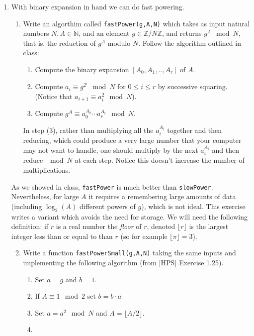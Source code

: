 \documentclass[11pt]{article}
\newcommand{\bN}{\mathbb{N}}
\newcommand{\bZ}{\mathbb{Z}}
\begin{document}
\begin{enumerate}
{  }
  \item{
  With binary expansion in hand we can do fast powering.
  \begin{enumerate}
    \item{
    Write an algorthim called \verb|fastPower(g,A,N)| which takes as input natural numbers $N,A\in\bN$, and an element $g\in\bZ/N\bZ$, and returns $g^A\mod N$, that is, the reduction of $g^A$ modulo $N$.  Follow the algorithm outlined in class:
    \begin{enumerate}[(1)]
      \item{
      Compute the binary expansion $[A_0,A_1,..,A_r]$ of $A$.
      }
      \item{
      Compute $a_i \equiv g^{2^i}\mod N$ for $0\le i\le r$ by successive squaring.  (Notice that $a_{i+1}\equiv a_i^2\mod N$).
      }
      \item{
      Compute $g^A \equiv a_0^{A_0}\cdots a_r^{A_r}\mod N$.
      }
    \end{enumerate}
    In step (3), rather than multiplying all the $a_i^{A_i}$ together and then reducing, which could produce a very large number that your computer may not want to handle, one should multiply by the next $a_i^{A_i}$ and then reduce $\mod N$ at each step.  Notice this doesn't increase the number of multiplications.
    }
  \end{enumerate}
  As we showed in class, \verb|fastPower| is much better than \verb|slowPower|.  Nevertheless, for large $A$ it requires a remembering large amounts of data (including $\log_2(A)$ different powers of $g$), which is not ideal.  This exercise writes a variant which avoids the need for storage.  We will need the following definition: if $r$ is a real number the \textit{floor} of $r$, denoted $\lfloor r\rfloor$ is the largest integer less than or equal to than $r$ (so for example $\lfloor \pi\rfloor = 3$).
  \begin{enumerate}
    \setcounter{enumii}{1}
    \item{
    Write a function \verb|fastPowerSmall(g,A,N)| taking the same inputs and implementing the following algorithm (from [HPS] Exercise 1.25).
    \begin{enumerate}[(1)]
      \item{
      Set $a = g$ and $b = 1$.
      }
      \item{
      If $A\equiv1\mod 2$ set $b = b\cdot a$
      }
      \item{
      Set $a = a^2\mod N$ and $A = \lfloor{A}/{2}\rfloor$.
      }
      \item{
}
\end{enumerate}}
\end{enumerate}}
\end{enumerate}
\end{document}
